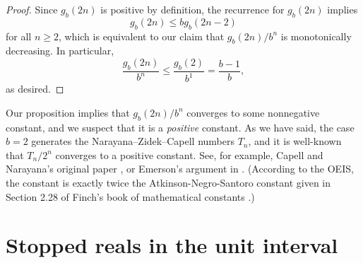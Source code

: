 \documentclass[12pt]{amsart}
\newcommand{\Z}{\mathbb{Z}}
\theoremstyle{definition}
\begin{document}
\begin{proof}
    Since $g_b(2n)$ is positive by definition, the recurrence for $g_b(2n)$
    implies
    \begin{equation*}
        g_b(2n) \leq b g_b(2n - 2)
    \end{equation*}
    for all $n \geq 2$, which is equivalent to our claim that $g_b(2n) / b^n$
    is monotonically decreasing. In particular,
    \begin{equation*}
        \frac{g_b(2n)}{b^n} \leq \frac{g_b(2)}{b^1} = \frac{b - 1}{b},
    \end{equation*}
    as desired.
\end{proof}

Our proposition implies that $g_b(2n) / b^n$ converges to some nonnegative
constant, and we suspect that it is a \emph{positive} constant. As we have
said, the case $b = 2$ generates the Narayana--Zidek--Capell numbers $T_n$,
and it is well-known that $T_n / 2^n$ converges to a positive constant. See,
for example, Capell and Narayana's original paper \cite{capell1970knock}, or
Emerson's argument in \cite{emerson2005family}. (According to the OEIS, the
constant is exactly twice the Atkinson-Negro-Santoro constant given in Section
2.28 of Finch's book of mathematical constants \cite{finch2003mathematical}.)

\section{Stopped reals in the unit interval}
\label{sec:reals}



\end{document}
